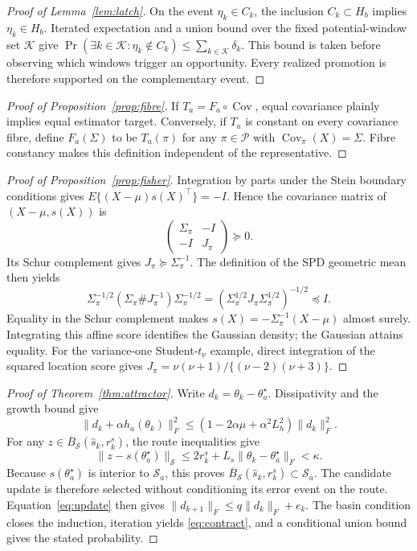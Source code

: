 \documentclass[11pt]{article}
\theoremstyle{plain}
\theoremstyle{definition}
\theoremstyle{remark}
\begin{document}
\begin{proof}[Proof of Lemma~\ref{lem:latch}]
On the event $\eta_k\in C_k$, the inclusion $C_k\subset H_b$ implies
$\eta_k\in H_b$. Iterated expectation and a union bound over the fixed
potential-window set $\mathcal K$ give
$\Pr(\exists k\in\mathcal K:\eta_k\notin C_k)
\le\sum_{k\in\mathcal K}\delta_k$. This bound is taken before observing which
windows trigger an opportunity. Every realized promotion is therefore
supported on the complementary event.
\end{proof}

\begin{proof}[Proof of Proposition~\ref{prop:fibre}]
If $T_a=F_a\circ\operatorname{Cov}$, equal covariance plainly implies equal
estimator target. Conversely, if $T_a$ is constant on every covariance fibre,
define $F_a(\Sigma)$ to be $T_a(\pi)$ for any $\pi\in\mathcal P$ with
$\operatorname{Cov}_\pi(X)=\Sigma$. Fibre constancy makes this definition
independent of the representative.
\end{proof}

\begin{proof}[Proof of Proposition~\ref{prop:fisher}]
Integration by parts under the Stein boundary conditions gives
$E\{(X-\mu)s(X)^\top\}=-I$. Hence the covariance matrix of
$(X-\mu,s(X))$ is
\[
 \begin{pmatrix}\Sigma_\pi&-I\\-I&J_\pi\end{pmatrix}\succeq0.
\]
Its Schur complement gives $J_\pi\succeq\Sigma_\pi^{-1}$. The definition of
the SPD geometric mean then yields
\[
 \Sigma_\pi^{-1/2}(\Sigma_\pi\#J_\pi^{-1})\Sigma_\pi^{-1/2}
 =(\Sigma_\pi^{1/2}J_\pi\Sigma_\pi^{1/2})^{-1/2}\preceq I.
\]
Equality in the Schur complement makes
$s(X)=-\Sigma_\pi^{-1}(X-\mu)$ almost surely. Integrating this affine score
identifies the Gaussian density; the Gaussian attains equality. For the
variance-one Student-$t_\nu$ example, direct integration of the squared
location score gives
$J_\pi=\nu(\nu+1)/\{(\nu-2)(\nu+3)\}$.
\end{proof}

\begin{proof}[Proof of Theorem~\ref{thm:attractor}]
Write $d_k=\theta_k-\theta_a^\star$. Dissipativity and the growth bound
give
\[
 \|d_k+\alpha h_a(\theta_k)\|_F^2
 \le(1-2\alpha\mu+\alpha^2L_h^2)\|d_k\|_F^2.
\]
For any $z\in\overline B_{\mathcal S}(\widehat s_k,r_k^s)$, the route
inequalities give
\[
\|z-s(\theta_a^\star)\|_{\mathcal S}
\le2r_k^s+L_s\|\theta_k-\theta_a^\star\|_F<\kappa.
\]
Because $s(\theta_a^\star)$ is interior to $\mathcal S_a$, this proves
$\overline B_{\mathcal S}(\widehat s_k,r_k^s)\subset\mathcal S_a$. The
candidate update is therefore
selected without conditioning its error event on the route.
Equation~\eqref{eq:update} then gives
$\|d_{k+1}\|_F\le q\|d_k\|_F+e_k$. The basin condition closes the induction,
iteration yields \eqref{eq:contract}, and a conditional union bound gives the
stated probability.
\end{proof}
\end{document}
